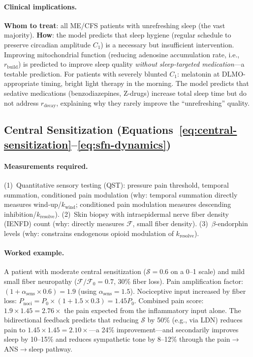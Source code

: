\paragraph{Clinical implications.}
\textbf{Whom to treat}: all ME/CFS patients with unrefreshing sleep (the vast majority). \textbf{How}: the model predicts that sleep hygiene (regular schedule to preserve circadian amplitude $C_1$) is a necessary but insufficient intervention. Improving mitochondrial function (reducing adenosine accumulation rate, i.e., $r_{\text{build}}$) is predicted to improve sleep quality \emph{without sleep-targeted medication}---a testable prediction. For patients with severely blunted $C_1$: melatonin at DLMO-appropriate timing, bright light therapy in the morning. The model predicts that sedative medications (benzodiazepines, Z-drugs) increase total sleep time but do not address $r_{\text{decay}}$, explaining why they rarely improve the ``unrefreshing'' quality.

\subsection{Central Sensitization (Equations~\ref{eq:central-sensitization}--\ref{eq:sfn-dynamics})}

\paragraph{Measurements required.}
(1)~Quantitative sensory testing (QST): pressure pain threshold, temporal summation, conditioned pain modulation (why: temporal summation directly measures wind-up/$k_{\text{wind}}$; conditioned pain modulation measures descending inhibition/$k_{\text{resolve}}$).
(2)~Skin biopsy with intraepidermal nerve fiber density (IENFD) count (why: directly measures $\mathcal{F}$, small fiber density).
(3)~$\beta$-endorphin levels (why: constrains endogenous opioid modulation of $k_{\text{resolve}}$).

\paragraph{Worked example.}
A patient with moderate central sensitization ($\mathcal{S} = 0.6$ on a 0--1 scale) and mild small fiber neuropathy ($\mathcal{F}/\mathcal{F}_0 = 0.7$, 30\% fiber loss). Pain amplification factor: $(1 + \alpha_{\text{sens}} \times 0.6) = 1.9$ (using $\alpha_{\text{sens}} = 1.5$). Nociceptive input increased by fiber loss: $P_{\text{noci}} = P_0 \times (1 + 1.5 \times 0.3) = 1.45 P_0$. Combined pain score: $1.9 \times 1.45 = 2.76 \times$ the pain expected from the inflammatory input alone. The bidirectional feedback predicts that reducing $\mathcal{S}$ by 50\% (e.g., via LDN) reduces pain to $1.45 \times 1.45 = 2.10 \times$---a 24\% improvement---and secondarily improves sleep by 10--15\% and reduces sympathetic tone by 8--12\% through the pain$\to$ANS$\to$sleep pathway.

